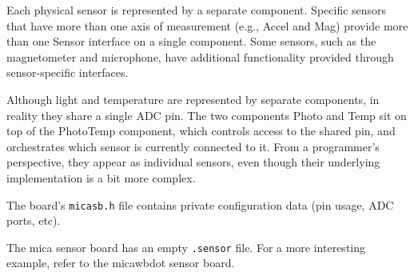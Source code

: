 \documentclass{article}
\begin{document}
Each physical sensor is represented by a separate component. Specific
sensors that have more than one axis of measurement (e.g., Accel and
Mag) provide more than one Sensor interface on a single component. Some
sensors, such as the magnetometer and microphone, have additional
functionality provided through sensor-specific interfaces.

Although light and temperature are represented by separate components,
in reality they share a single ADC pin. The two components Photo and
Temp sit on top of the PhotoTemp component, which controls access to
the shared pin, and orchestrates which sensor is currently connected
to it. From a programmer's perspective, they appear as individual
sensors, even though their underlying implementation is a bit more
complex.

The board's {\tt micasb.h} file contains private configuration data
(pin usage, ADC ports, etc).

The mica sensor board has an empty {\tt .sensor} file. For a more
interesting example, refer to the micawbdot sensor board.
\end{document}
